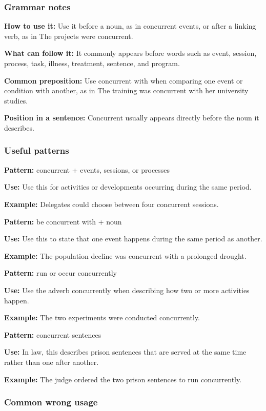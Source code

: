 \documentclass[11pt]{article}
\begin{document}
\subsubsection{Grammar notes}
\textbf{How to use it:} Use it before a noun, as in concurrent events, or after a linking verb, as in The projects were concurrent.

\textbf{What can follow it:} It commonly appears before words such as event, session, process, task, illness, treatment, sentence, and program.

\textbf{Common preposition:} Use concurrent with when comparing one event or condition with another, as in The training was concurrent with her university studies.

\textbf{Position in a sentence:} Concurrent usually appears directly before the noun it describes.

\subsubsection{Useful patterns}
\textbf{Pattern:} concurrent + events, sessions, or processes

\textbf{Use:} Use this for activities or developments occurring during the same period.

\textbf{Example:} Delegates could choose between four concurrent sessions.

\textbf{Pattern:} be concurrent with + noun

\textbf{Use:} Use this to state that one event happens during the same period as another.

\textbf{Example:} The population decline was concurrent with a prolonged drought.

\textbf{Pattern:} run or occur concurrently

\textbf{Use:} Use the adverb concurrently when describing how two or more activities happen.

\textbf{Example:} The two experiments were conducted concurrently.

\textbf{Pattern:} concurrent sentences

\textbf{Use:} In law, this describes prison sentences that are served at the same time rather than one after another.

\textbf{Example:} The judge ordered the two prison sentences to run concurrently.

\subsubsection{Common wrong usage}
\end{document}
